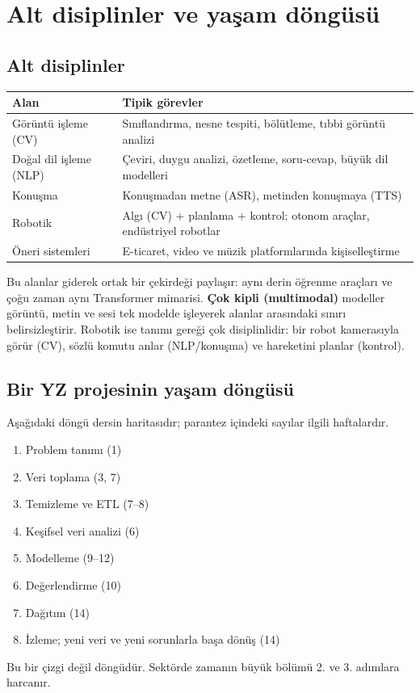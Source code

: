 \documentclass[11pt,a4paper]{article}
\begin{document}
\section{Alt disiplinler ve yaşam döngüsü}

\subsection{Alt disiplinler}
\begin{center}
\begin{tabularx}{\textwidth}{@{}l Y@{}}
\toprule
\textbf{Alan} & \textbf{Tipik görevler} \\
\midrule
Görüntü işleme (CV) & Sınıflandırma, nesne tespiti, bölütleme, tıbbi görüntü analizi \\
Doğal dil işleme (NLP) & Çeviri, duygu analizi, özetleme, soru-cevap, büyük dil modelleri \\
Konuşma & Konuşmadan metne (ASR), metinden konuşmaya (TTS) \\
Robotik & Algı (CV) + planlama + kontrol; otonom araçlar, endüstriyel robotlar \\
Öneri sistemleri & E-ticaret, video ve müzik platformlarında kişiselleştirme \\
\bottomrule
\end{tabularx}
\end{center}
Bu alanlar giderek ortak bir çekirdeği paylaşır: aynı derin öğrenme araçları ve çoğu zaman aynı Transformer mimarisi. \textbf{Çok kipli (multimodal)} modeller görüntü, metin ve sesi tek modelde işleyerek alanlar arasındaki sınırı belirsizleştirir. Robotik ise tanımı gereği çok disiplinlidir: bir robot kamerasıyla görür (CV), sözlü komutu anlar (NLP/konuşma) ve hareketini planlar (kontrol).

\subsection{Bir YZ projesinin yaşam döngüsü}
Aşağıdaki döngü dersin haritasıdır; parantez içindeki sayılar ilgili haftalardır.
\begin{enumerate}
  \item Problem tanımı (1)
  \item Veri toplama (3, 7)
  \item Temizleme ve ETL (7–8)
  \item Keşifsel veri analizi (6)
  \item Modelleme (9–12)
  \item Değerlendirme (10)
  \item Dağıtım (14)
  \item İzleme; yeni veri ve yeni sorunlarla başa dönüş (14)
\end{enumerate}
Bu bir çizgi değil döngüdür. Sektörde zamanın büyük bölümü 2. ve 3. adımlara harcanır.
\end{document}
